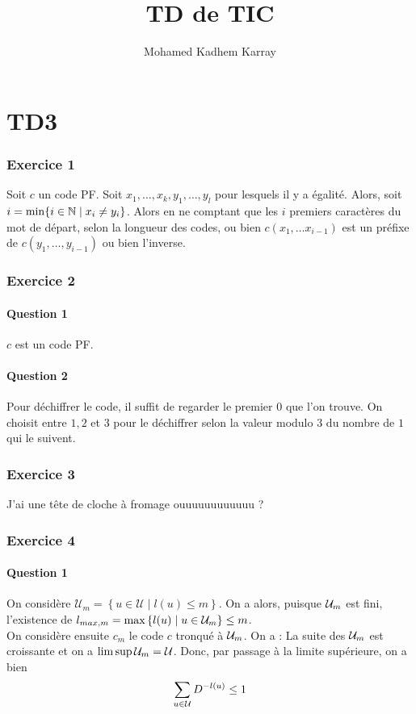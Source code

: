 \documentclass{cours}
\title{TD de TIC}
\author{Mohamed Kadhem Karray}
\begin{document}
\part{TD3}
\section{Exercice 1}
Soit $c$ un code PF. Soit $x_1, \ldots, x_{k}, y_{1}, \ldots, y_{l}$ pour lesquels il y a égalité. Alors, soit $i = \min \{i \in \mathbb{N} \mid x_{i} \neq y_{i}\}$. Alors en ne comptant que les $i$ premiers caractères du mot de départ, selon la longueur des codes, ou bien $c(x_{1},\ldots x_{i - 1})$ est un préfixe de $c(y_{1}, \ldots, y_{i - 1})$ ou bien l'inverse.

\section{Exercice 2}
\subsection{Question 1}
$c$ est un code PF. 

\subsection{Question 2}
Pour déchiffrer le code, il suffit de regarder le premier $0$ que l'on trouve. On choisit entre $1, 2$ et $3$ pour le déchiffrer selon la valeur modulo $3$ du nombre de $1$ qui le suivent. 

\section{Exercice 3}
J'ai une tête de cloche à fromage ouuuuuuuuuuuu ?

\section{Exercice 4}
\subsection{Question 1}
On considère $\mathcal{U}_{m} = \left\{u \in \mathcal{U} \mid l(u) \leq m\right\}$. On a alors, puisque $\mathcal{U}_{m}$ est fini, l'existence de $l_{max, m} = \max \left\{l(u) \mid u \in \mathcal{U}_{m}\right\} \leq m$. \\
On considère ensuite $c_{m}$ le code $c$ tronqué à $\mathcal{U}_{m}$. On a :  
La suite des $\mathcal{U}_{m}$ est croissante et on a $\limsup \mathcal{U}_{m} = \mathcal{U}$. Donc, par passage à la limite supérieure, on a bien 
\[
    \sum_{u \in \mathcal{U}}D^{-l(u)} \leq 1
\]
\end{document}
